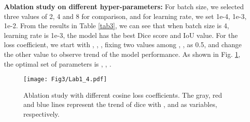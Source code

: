 \documentclass{article}
\begin{document}
\noindent\textbf{Ablation study on different hyper-parameters:} For batch size, we selected three values of 2, 4 and 8 for comparison, and for learning rate, we set 1e-4, 1e-3, 1e-2. From the results in Table \ref{tab3}, we can see that when batch size is 4, learning rate is 1e-3, the model has the best Dice score and IoU value. For the loss coefficient,  we start with , , , fixing two values among  , ,  as 0.5, and change the other value to observe trend of the model performance. As shown in Fig. \ref{Analysiscoef}, the optimal set of parameters is , , .
\vspace{-2mm}
\begin{figure}[!ht]
\setlength{\abovecaptionskip}{-10cm}
\setlength{\belowcaptionskip}{-15cm}
\centering \texttt{[image: Fig3/Lab1\_4.pdf]}
\caption{Ablation study with different cosine loss coefficients. The gray, red and blue lines represent the trend of dice with ,  and  as variables, respectively.}
\label{Analysiscoef}
\vspace{-6mm}
\end{figure}
\vspace{-3mm}
\begin{table}[!ht]
\centering
\caption{Ablation study on different hyper-parameters.}
\label{tab3}
\vspace{-8mm}
\end{table}
\end{document}
